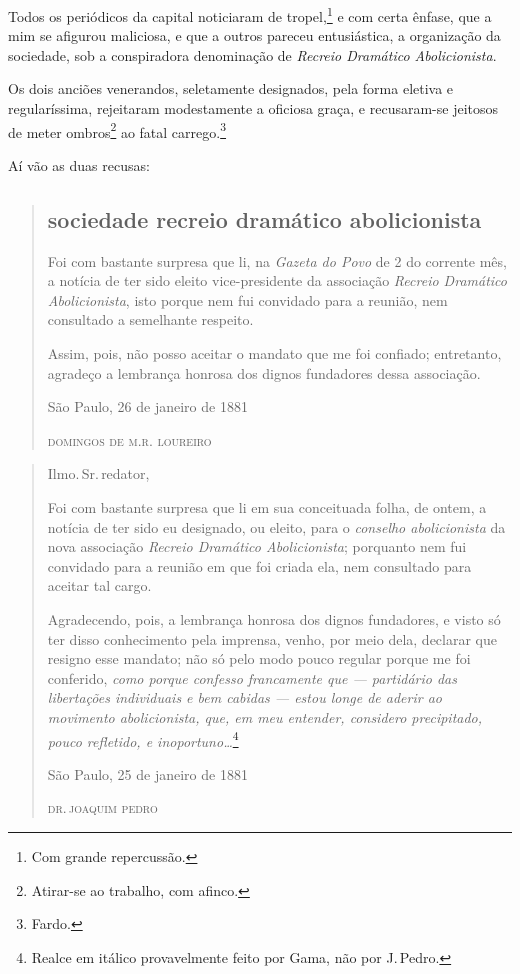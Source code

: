 Todos os periódicos da capital noticiaram de tropel,\footnote{Com
  grande repercussão.} e com certa ênfase, que a mim se afigurou
maliciosa, e que a outros pareceu entusiástica, a organização da
sociedade, sob a conspiradora denominação de \emph{Recreio
Dramático Abolicionista}.

Os dois anciões venerandos, seletamente designados, pela forma eletiva e
regularíssima, rejeitaram modestamente a oficiosa graça, e recusaram-se
jeitosos de meter ombros\footnote{Atirar-se ao trabalho, com afinco.}
ao fatal carrego.\footnote{Fardo.}

Aí vão as duas recusas:

\begin{quote}
\subsection{sociedade recreio dramático abolicionista}

Foi com bastante surpresa que li, na \emph{Gazeta do Povo} de 2 do
corrente mês, a notícia de ter sido eleito vice-presidente da associação
\emph{Recreio Dramático Abolicionista}, isto porque nem fui convidado
para a reunião, nem consultado a semelhante respeito.

Assim, pois, não posso aceitar o mandato que me foi confiado;
entretanto, agradeço a lembrança honrosa dos dignos fundadores dessa
associação.\medskip

\hfill{}São Paulo, 26 de janeiro de 1881

\hfill\textsc{domingos de m.r. loureiro}
\end{quote}

\asterisc

\begin{quote}
Ilmo.\,Sr.\,redator,

Foi com bastante surpresa que li em sua conceituada folha, de ontem, a
notícia de ter sido eu designado, ou eleito, para o \emph{conselho
abolicionista} da nova associação \emph{Recreio Dramático
Abolicionista}; porquanto nem fui convidado para a reunião em que foi
criada ela, nem consultado para aceitar tal cargo.

Agradecendo, pois, a lembrança honrosa dos dignos fundadores, e visto só
ter disso conhecimento pela imprensa, venho, por meio dela, declarar que
resigno esse mandato; não só pelo modo pouco regular porque me foi
conferido, \emph{como porque confesso francamente que --- partidário
das libertações individuais e bem cabidas --- estou longe de aderir ao
movimento abolicionista, que, em meu entender, considero precipitado,
pouco refletido, e inoportuno\ldots{}}\footnote{Realce em itálico
  provavelmente feito por Gama, não por J.\,Pedro.}\medskip

\hfill{}São Paulo, 25 de janeiro de 1881

\hfill\textsc{dr.\,joaquim pedro}
\end{quote}

